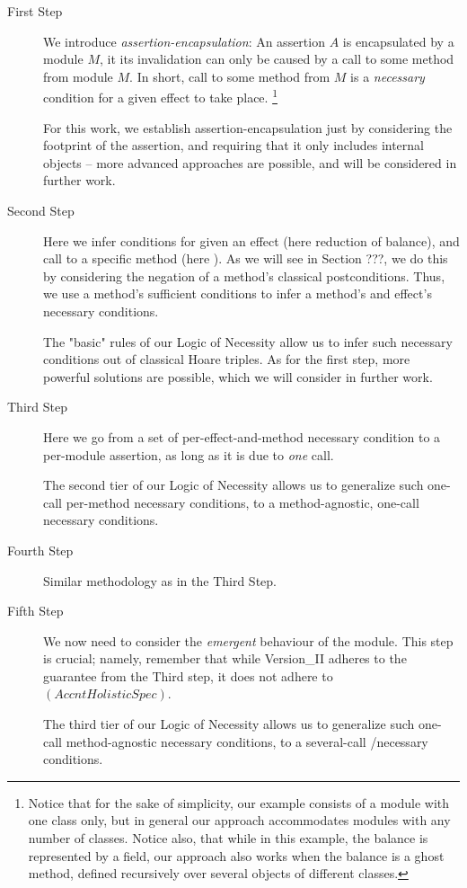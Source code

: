 \begin{description}
\item[First Step] We introduce  \emph{assertion-encapsulation}: An assertion $A$  is
encapsulated by a module $M$, it 
  its invalidation can only be caused   by a call to some method from module $M$. 
  In short, call to some method from $M$ is a \emph{necessary} condition for
a given effect to take place.
\footnote{Notice that for the sake of simplicity, our example consists of a module with one class only, but 
    in general our approach accommodates modules with any number of classes.
     Notice also, that while in this example, the balance is 
represented by a field, our approach also works when the balance is a ghost method, defined 
recursively over several objects of different classes.}

For this work, we establish assertion-encapsulation just by considering the 
footprint of the assertion, and requiring that it only includes internal objects --
more advanced approaches are possible, and will be considered in further work.


\item[Second Step]  
Here we infer  conditions for given an effect (here reduction of balance), and call to a specific method
(here ). As we will see in Section ???, we do this by considering the negation of a method's
classical postconditions. Thus, we use a method's sufficient conditions to infer a method's and effect's necessary conditions.

The "basic" rules of our Logic of Necessity allow us to infer such necessary conditions out of classical Hoare triples.
As for the first step, more powerful solutions are possible, which we will consider  in further work. 

\item[Third Step]  Here we go from a set
of per-effect-and-method necessary  condition to a per-module assertion, as long as it is due to 
\emph{one} \internalC call.

The second tier of our Logic of Necessity allows us to generalize  such one-call per-method necessary conditions, to a method-agnostic, one-call necessary conditions.

\item[Fourth Step] Similar methodology as in the Third Step.



\item[Fifth Step] 
We now need to consider the \emph{emergent} behaviour of the module.  This step is crucial; namely, remember that while Version\_II adheres to
the guarantee from the Third step, it does not adhere to  $(AccntHolisticSpec)$.   

The third tier of our Logic of Necessity allows us to generalize  such one-call method-agnostic necessary conditions, to a several-call \internalC/\externalC necessary conditions.

\end{description} 
